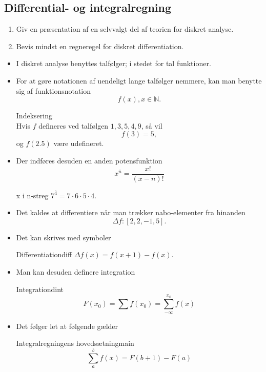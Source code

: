 \documentclass{article}
\begin{document}
\begin{tcolorbox}
	\section{Differential- og integralregning}
	\tcblower
	\begin{enumerate}
		\item Giv en præsentation af en selvvalgt del af teorien for diskret analyse.
		\item Bevis mindst en regneregel for diskret differentiation.
	\end{enumerate}
\end{tcolorbox}
\begin{itemize}
	\item I diskret analyse benyttes talfølger; i stedet for tal funktioner.
	\item For at gøre notationen af uendeligt lange talfølger nemmere, kan man benytte sig af funktionsnotation
		\[
			f(x), x\in\mathbb{N}.
		\]
		\begin{eksempel}{Indeksering}{}\\
			Hvis $f$ defineres ved talfølgen $1, 3, 5, 4, 9$, så vil
			\[
				f(3) = 5,
			\] 
			og $f(2.5)$ være udefineret.
		\end{eksempel}
	\item Der indføres desuden en anden potensfunktion
		\[
			x^{\overline{n}} = \frac{x!}{(x-n)!}
		\] 
		\begin{eksempel}{x i n-streg}{}
			$
				7^{\overline{4}} = 7 \cdot 6 \cdot 5 \cdot 4.
			$ 
		\end{eksempel}
	\item Det kaldes at differentiere når man trækker nabo-elementer fra hinanden
		\[
			\Delta f: [2, 2, -1, 5].
		\] 
	\item Det kan skrives med symboler
		\begin{definition}{Differentiation}{diff}
			$
				\Delta f(x) = f(x + 1) - f(x).
			$ 
		\end{definition}
	\item Man kan desuden definere integration
		\begin{definition}{Integration}{dint}
			\[
				F(x_0) = \sum f(x_0) = \sum_{-\infty}^{x_0} f(x) 
			\]
		\end{definition}
	\item Det følger let at følgende gælder
		\begin{theorem}{Integralregningens hovedsætning}{main}
			\[
				\sum_a^b f(x) = F(b + 1) - F(a)
			\]
		\end{theorem}
\end{itemize}
\end{document}
